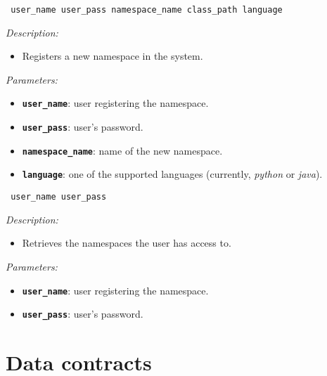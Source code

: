 \begin{dBox}
\texttt{ \newline user\_name user\_pass namespace\_name class\_path language}
\LINE

{\it Description:}

\begin{itemize}
    \item Registers a new namespace in the system.
\end{itemize}

{\it Parameters:}

\begin{itemize}
    \item \texttt{\bfseries user\_name}: user registering the namespace.
    \item \texttt{\bfseries user\_pass}: user's password.
    \item \texttt{\bfseries namespace\_name}: name of the new namespace.
    \item \texttt{\bfseries language}: one of the supported languages (currently, \textit{python} or \textit{java}).
\end{itemize}
 
\end{dBox}


\begin{dBox}
\texttt{ \newline user\_name user\_pass}
\LINE

{\it Description:}

\begin{itemize}
    \item Retrieves the namespaces the user has access to.
\end{itemize}

{\it Parameters:}

\begin{itemize}
    \item \texttt{\bfseries user\_name}: user registering the namespace.
    \item \texttt{\bfseries user\_pass}: user's password.
\end{itemize}
 
\end{dBox}


\section{Data contracts}

